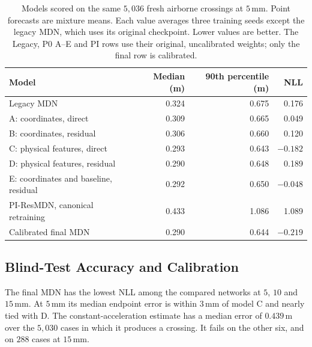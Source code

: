 \documentclass[11pt,a4paper]{article}
\begin{document}
\begin{table}[htbp]
  \centering
  \caption{Models scored on the same $5{,}036$ fresh airborne crossings at $5\,\mathrm{mm}$. Point forecasts are mixture means. Each value averages three training seeds except the legacy MDN, which uses its original checkpoint. Lower values are better. The Legacy, P0 A--E and PI rows use their original, uncalibrated weights; only the final row is calibrated.}
  \label{tab:modelcomparison}
  \begin{tabular}{lrrr}
    \toprule
    Model & Median (m) & 90th percentile (m) & NLL \\
    \midrule
    Legacy MDN & 0.324 & 0.675 & 0.176 \\
    A: coordinates, direct & 0.309 & 0.665 & 0.049 \\
    B: coordinates, residual & 0.306 & 0.660 & 0.120 \\
    C: physical features, direct & 0.293 & 0.643 & $-0.182$ \\
    D: physical features, residual & 0.290 & 0.648 & 0.189 \\
    E: coordinates and baseline, residual & 0.292 & 0.650 & $-0.048$ \\
    PI-ResMDN, canonical retraining & 0.433 & 1.086 & 1.089 \\
    Calibrated final MDN & 0.290 & 0.644 & $\mathbf{-0.219}$ \\
    \bottomrule
  \end{tabular}
\end{table}

\subsection{Blind-Test Accuracy and Calibration}
\label{sec:blind}

The final MDN has the lowest NLL among the compared networks at $5$, $10$ and $15\,\mathrm{mm}$. At $5\,\mathrm{mm}$ its median endpoint error is within $3\,\mathrm{mm}$ of model C and nearly tied with D. The constant-acceleration estimate has a median error of $0.439\,\mathrm{m}$ over the $5{,}030$ cases in which it produces a crossing. It fails on the other six, and on $288$ cases at $15\,\mathrm{mm}$.

\begin{table}[htbp]
  \centering
  \small
  \caption{Final MDN on $5{,}036$ independently generated airborne crossings, averaged over three training seeds. The two coverage columns show before and after calibration in percent. The area and NLL are post-calibration values.}
  \label{tab:holdout}
  
\end{table}
\end{document}
